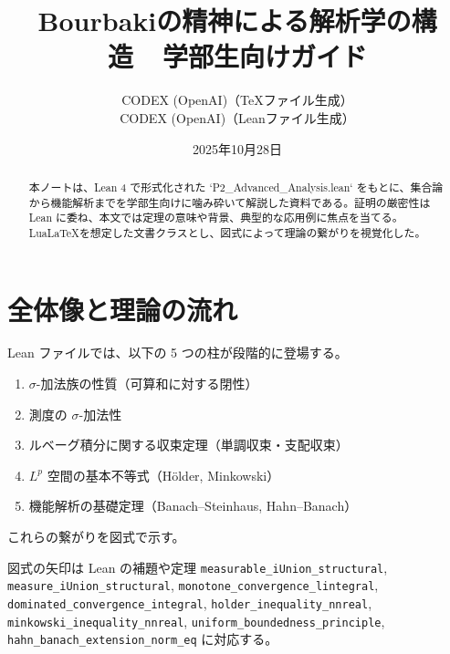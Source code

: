 \documentclass[a4paper]{ltjsarticle}
\title{Bourbakiの精神による解析学の構造\texorpdfstring{\ \textemdash\ }{ }学部生向けガイド}
\author{CODEX (OpenAI)（TeXファイル生成）\\CODEX (OpenAI)（Leanファイル生成）}
\date{2025年10月28日}
\theoremstyle{definition}
\theoremstyle{plain}
\begin{document}
\maketitle

\begin{abstract}
本ノートは、Lean 4 で形式化された `P2\_Advanced\_Analysis.lean` をもとに、集合論から機能解析までを学部生向けに噛み砕いて解説した資料である。証明の厳密性は Lean に委ね、本文では定理の意味や背景、典型的な応用例に焦点を当てる。Lua\LaTeX を想定した文書クラスとし、図式によって理論の繋がりを視覚化した。
\end{abstract}

\tableofcontents

\section{全体像と理論の流れ}
Lean ファイルでは、以下の 5 つの柱が段階的に登場する。

\begin{enumerate}[label=\arabic*.]
  \item $\sigma$-加法族の性質（可算和に対する閉性）
  \item 測度の $\sigma$-加法性
  \item ルベーグ積分に関する収束定理（単調収束・支配収束）
  \item $L^p$ 空間の基本不等式（Hölder, Minkowski）
  \item 機能解析の基礎定理（Banach--Steinhaus, Hahn--Banach）
\end{enumerate}

これらの繋がりを図式で示す。

\begin{center}
\end{center}

図式の矢印は Lean の補題や定理
\texttt{measurable\_iUnion\_structural},
\texttt{measure\_iUnion\_structural},
\texttt{monotone\_convergence\_lintegral},
\texttt{dominated\_convergence\_integral},
\texttt{holder\_inequality\_nnreal},
\texttt{minkowski\_inequality\_nnreal},
\texttt{uniform\_boundedness\_principle},
\texttt{hahn\_banach\_extension\_norm\_eq}
に対応する。
\end{document}
